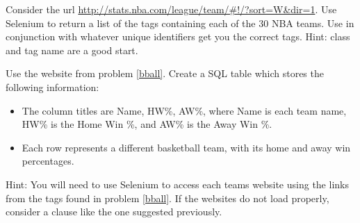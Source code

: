 \begin{problem}\label{bball}
Consider the url \url{http://stats.nba.com/league/team/#!/?sort=W&dir=1}.
Use Selenium to return a list of the  tags containing each of the 30 NBA teams.
Use  in conjunction with whatever unique identifiers get you the correct tags.
Hint: class and tag name are a good start.
\end{problem}

\begin{problem}
Use the website from problem \ref{bball}.
Create a SQL table which stores the following information:
\begin{itemize}
\item The column titles are Name, HW\%, AW\%, where Name is each team name, HW\% is the Home Win \%, and AW\% is the Away Win \%.
\item Each row represents a different basketball team, with its home and away win percentages.
\end{itemize}
Hint: You will need to use Selenium to access each teams website using the links from the tags found in problem \ref{bball}.
If the websites do not load properly, consider a  clause like the one suggested previously.
\end{problem}